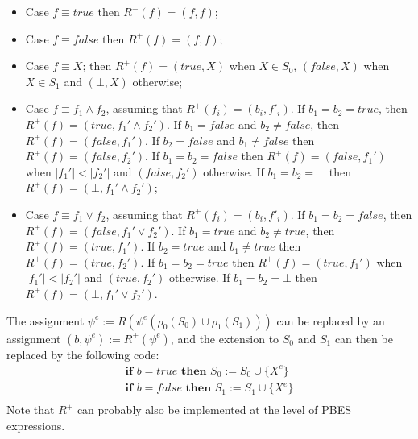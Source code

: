 \documentclass{article}
\begin{document}
\begin{itemize}
\item Case $f \equiv true$  then $R^+(f) = (f,f)$;
\item Case $f \equiv false$ then $R^+(f) = (f,f)$;
\item Case $f \equiv X$; then $R^+(f) =(true,X)$ when $X \in S_0$, $(false, X)$ when $X \in S_1$ and $(\bot, X)$ otherwise;
\item Case $f \equiv f_1 \wedge f_2$, assuming that $R^+(f_i) = (b_i,f'_i)$. If $b_1 = b_2 = true$, then
$R^+(f) = (true, f_1' \wedge f_2')$. If $b_1 = false$ and $b_2 \neq false$, then $R^+(f) = (false, f_1')$. 
If $b_2 = false$ and $b_1 \neq false$ then $R^+(f) = (false,f_2')$. If $b_1 = b_2 = false$ then
$R^+(f) = (false, f_1')$ when $|f_1'| < |f_2'|$ and $(false,f_2')$ otherwise. If $b_1 = b_2 = \bot$ then
$R^+(f) = (\bot, f_1' \wedge f_2')$;

\item Case $f \equiv f_1 \vee f_2$,  assuming that $R^+(f_i) = (b_i,f'_i)$. If $b_1 = b_2 = false$, then
$R^+(f) = (false, f_1' \vee f_2')$. If $b_1 = true$ and $b_2 \neq true$, then $R^+(f) = (true, f_1')$. 
If $b_2 = true$ and $b_1 \neq true$ then $R^+(f) = (true,f_2')$. If $b_1 = b_2 = true$ then
$R^+(f) = (true, f_1')$ when $|f_1'| < |f_2'|$ and $(true,f_2')$ otherwise. If $b_1 = b_2 = \bot$ then
$R^+(f) = (\bot, f_1' \vee f_2')$.
\end{itemize}

The assignment $\psi^e := R(\psi^e(\rho_0(S_0) \cup \rho_1(S_1)))$ can be replaced by an assignment
$(b,\psi^e) := R^+(\psi^e)$, and the extension to $S_0$ and $S_1$ can then be replaced by the
following code:
\[
\begin{array}{l}
\textbf{if $b = true$ then } S_0 := S_0 \cup \{ X^e \} \\
\textbf{if $b = false$ then } S_1 := S_1 \cup \{ X^e \} \\
\end{array}
\]
Note that $R^+$ can probably also be implemented at the level of PBES expressions.
\end{document}
